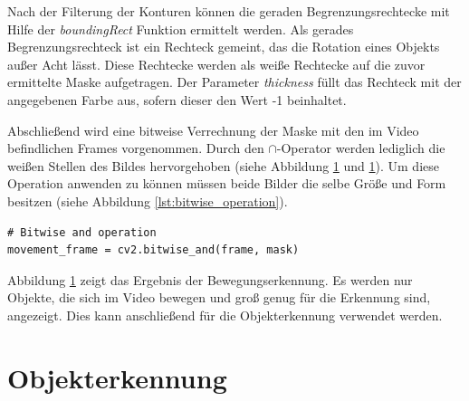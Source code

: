 Nach der Filterung der Konturen können die geraden Begrenzungsrechtecke mit Hilfe der \emph{boundingRect} Funktion ermittelt werden. Als gerades Begrenzungsrechteck ist ein Rechteck gemeint, das die Rotation eines Objekts außer Acht lässt. Diese Rechtecke werden als weiße Rechtecke auf die zuvor ermittelte Maske aufgetragen. Der Parameter \emph{thickness} füllt das Rechteck mit der angegebenen Farbe aus, sofern dieser den Wert -1 beinhaltet. 


Abschließend wird eine bitweise Verrechnung der Maske mit den im Video befindlichen Frames vorgenommen. Durch den $\cap$-Operator werden lediglich die weißen Stellen des Bildes hervorgehoben (siehe Abbildung \ref{} und \ref{}). Um diese Operation anwenden zu können müssen beide Bilder die selbe Größe und Form besitzen (siehe Abbildung \ref{lst:bitwise_operation}).

\vspace*{10mm}
\begin{lstlisting}[caption={UND-Operation der Maske und des aktuellen Bildes}, label={lst:bitwise_operation}]
# Bitwise and operation
movement_frame = cv2.bitwise_and(frame, mask)
\end{lstlisting}

Abbildung \ref{} zeigt das Ergebnis der Bewegungserkennung. Es werden nur Objekte, die sich im Video bewegen und groß genug für die Erkennung sind, angezeigt. Dies kann anschließend für die Objekterkennung verwendet werden. 

\section{Objekterkennung}


